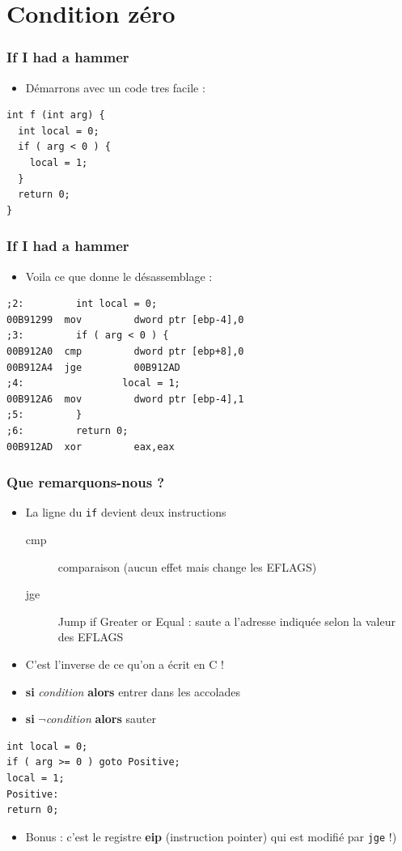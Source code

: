 \documentclass{beamer}
\begin{document}
\section{Condition zéro}
\begin{frame}[fragile]
\frametitle{If I had a hammer}
\begin{itemize}
\item Démarrons avec un code tres facile :
\end{itemize}
\begin{lstlisting}
int f (int arg) {
  int local = 0;
  if ( arg < 0 ) {
    local = 1;
  }
  return 0;
}
\end{lstlisting}
\end{frame}

\begin{frame}[fragile]
\frametitle{If I had a hammer}
\begin{itemize}
\item Voila ce que donne le désassemblage : 
\end{itemize}
\begin{lstlisting}[language={[x86masm]Assembler}]
;2:         int local = 0;
00B91299  mov         dword ptr [ebp-4],0  
;3:         if ( arg < 0 ) {
00B912A0  cmp         dword ptr [ebp+8],0  
00B912A4  jge         00B912AD  
;4:                 local = 1;
00B912A6  mov         dword ptr [ebp-4],1  
;5:         }
;6:         return 0;
00B912AD  xor         eax,eax  
\end{lstlisting}
\end{frame}

\begin{frame}[fragile]
\frametitle{Que remarquons-nous ?}
\begin{itemize}
\item La ligne du \lstinline+if+ devient deux instructions
\begin{description} 
\item[cmp] comparaison (aucun effet mais change les EFLAGS)
\item[jge] Jump if Greater or Equal  : saute a l'adresse indiquée selon la valeur des EFLAGS
\end{description} 
\pause
\item C'est l'inverse de ce qu'on a écrit en C !
\pause
\item \textbf{si} \textit{condition} \textbf{alors} entrer dans les accolades
\item \textbf{si} $\neg$\textit{condition} \textbf{alors} sauter 
\end{itemize}


\begin{lstlisting}
int local = 0;
if ( arg >= 0 ) goto Positive;
local = 1;
Positive:
return 0;
\end{lstlisting}
\pause
\begin{itemize}
\item Bonus : c'est le registre \textbf{eip} (instruction pointer) qui est modifié par \texttt{jge} !)
\end{itemize}
\end{frame}
\end{document}
